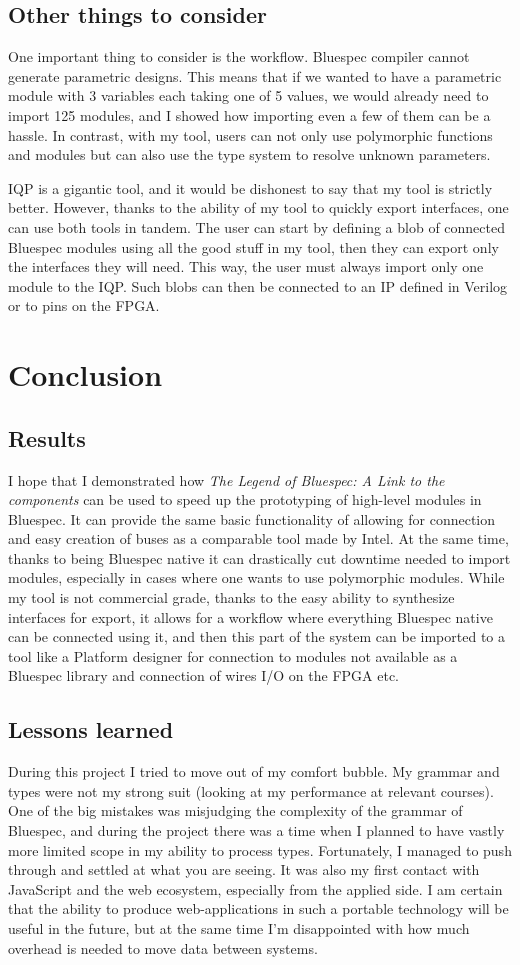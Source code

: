 \documentclass[12pt]{report}
\begin{document}
\section{Other things to consider} 
One important thing to consider is the workflow. Bluespec compiler cannot generate parametric designs. This means that if we wanted to have a parametric module with 3 variables each taking one of 5 values, we would already need to import 125 modules, and I showed how importing even a few of them can be a hassle. In contrast, with my tool, users can not only use polymorphic functions and modules but can also use the type system to resolve unknown parameters. 
\par 
IQP is a gigantic tool, and it would be dishonest to say that my tool is strictly better. However, thanks to the ability of my tool to quickly export interfaces, one can use both tools in tandem. The user can start by defining a blob of connected Bluespec modules using all the good stuff in my tool, then they can export only the interfaces they will need. This way, the user must always import only one module to the IQP. Such blobs can then be connected to an IP defined in Verilog or to pins on the FPGA.  
\chapter{Conclusion} 
\section{Results} 
I hope that I demonstrated how \emph{The Legend of Bluespec: A Link to the components} can be used to speed up the prototyping of high-level modules in Bluespec. It can provide the same basic functionality of allowing for connection and easy creation of buses as a comparable tool made by Intel. At the same time, thanks to being Bluespec native it can drastically cut downtime needed to import modules, especially in cases where one wants to use polymorphic modules. While my tool is not commercial grade, thanks to the easy ability to synthesize interfaces for export, it allows for a workflow where everything Bluespec native can be connected using it, and then this part of the system can be imported to a tool like a Platform designer for connection to modules not available as a Bluespec library and connection of wires I/O on the FPGA etc. 
\section{Lessons learned}
During this project I tried to move out of my comfort bubble. My grammar and types were not my strong suit (looking at my performance at relevant courses). One of the big mistakes was misjudging the complexity of the grammar of Bluespec, and during the project there was a time when I planned to have vastly more limited scope in my ability to process types. Fortunately, I managed to push through and settled at what you are seeing. It was also my first contact with JavaScript and the web ecosystem, especially from the applied side. I am certain that the ability to produce web-applications in such a portable technology will be useful in the future, but at the same time I'm disappointed with how much overhead is needed to move data between systems.  
\end{document}
